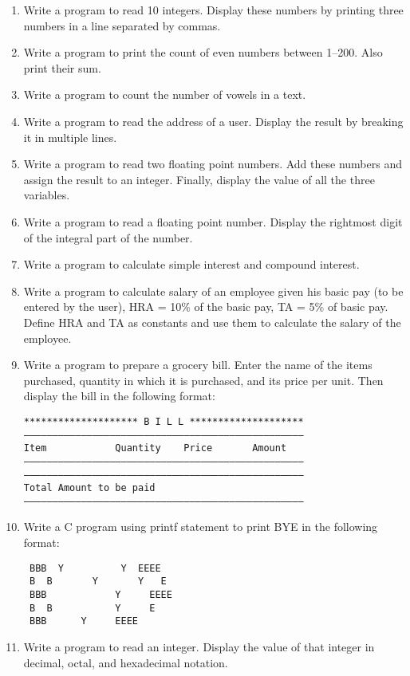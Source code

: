 \documentclass[fontsize=12pt,paper=a4]{book}
\begin{document}
\begin{enumerate}
 \item Write a program to read 10 integers. Display these numbers by printing three numbers in a line
       separated by commas.
 \item Write a program to print the count of even numbers between 1–200. Also print their sum.
 \item Write a program to count the number of vowels in a text.
 \item Write a program to read the address of a user. Display the result by breaking it in multiple lines.
 \item Write a program to read two floating point numbers. Add these numbers and assign the result to an integer. Finally, display the value of all the three variables.
 \item Write a program to read a floating point number. Display the rightmost digit of the integral part of the number.
 \item Write a program to calculate simple interest and compound interest.
 \item Write a program to calculate salary of an employee given his basic pay (to be entered by the user), HRA = 10\% of the basic pay, TA = 5\% of basic pay. Define HRA and TA as constants and use them to calculate the salary of the employee.
 \item Write a program to prepare a grocery bill. Enter
       the name of the items purchased, quantity in which
       it is purchased, and its price per unit. Then display
       the bill in the following format:
       \begin{lstlisting}
******************** B I L L ********************
–––––––––––––––––––––––––––––––––––––––––––––––––
Item            Quantity    Price       Amount
–––––––––––––––––––––––––––––––––––––––––––––––––
–––––––––––––––––––––––––––––––––––––––––––––––––
Total Amount to be paid
–––––––––––––––––––––––––––––––––––––––––––––––––
       \end{lstlisting}
 \item Write a C program using printf statement to print BYE in the following format:
       \begin{lstlisting}
 BBB  Y			 Y  EEEE
 B  B		Y		Y   E
 BBB			Y     EEEE
 B  B			Y     E
 BBB      Y     EEEE
       \end{lstlisting}
 \item Write a program to read an integer. Display the value of that integer in decimal, octal, and
       hexadecimal notation.

\end{enumerate}
\end{document}
